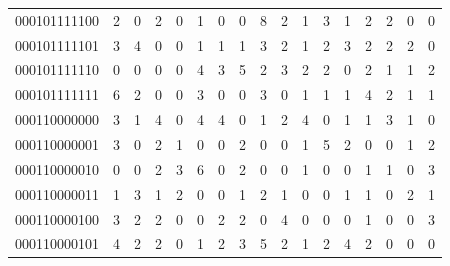 \documentclass[10pt,a4paper]{article}
\begin{document}
\begin{longtable}{ |c|c|c|c|c|c|c|c|c|c|c|c|c|c|c|c|c| }
    000101111100              & 2                            & 0                                & 2                            & 0                              & 1   & 0   & 0   & 8   & 2   & 1   & 3   & 1   & 2   & 2   & 0   & 0   \\
    000101111101              & 3                            & 4                                & 0                            & 0                              & 1   & 1   & 1   & 3   & 2   & 1   & 2   & 3   & 2   & 2   & 2   & 0   \\
    000101111110              & 0                            & 0                                & 0                            & 0                              & 4   & 3   & 5   & 2   & 3   & 2   & 2   & 0   & 2   & 1   & 1   & 2   \\
    000101111111              & 6                            & 2                                & 0                            & 0                              & 3   & 0   & 0   & 3   & 0   & 1   & 1   & 1   & 4   & 2   & 1   & 1   \\
    000110000000              & 3                            & 1                                & 4                            & 0                              & 4   & 4   & 0   & 1   & 2   & 4   & 0   & 1   & 1   & 3   & 1   & 0   \\
    000110000001              & 3                            & 0                                & 2                            & 1                              & 0   & 0   & 2   & 0   & 0   & 1   & 5   & 2   & 0   & 0   & 1   & 2   \\
    000110000010              & 0                            & 0                                & 2                            & 3                              & 6   & 0   & 2   & 0   & 0   & 1   & 0   & 0   & 1   & 1   & 0   & 3   \\
    000110000011              & 1                            & 3                                & 1                            & 2                              & 0   & 0   & 1   & 2   & 1   & 0   & 0   & 1   & 1   & 0   & 2   & 1   \\
    000110000100              & 3                            & 2                                & 2                            & 0                              & 0   & 2   & 2   & 0   & 4   & 0   & 0   & 0   & 1   & 0   & 0   & 3   \\
    000110000101              & 4                            & 2                                & 2                            & 0                              & 1   & 2   & 3   & 5   & 2   & 1   & 2   & 4   & 2   & 0   & 0   & 0   \\

\end{longtable}
\end{document}
